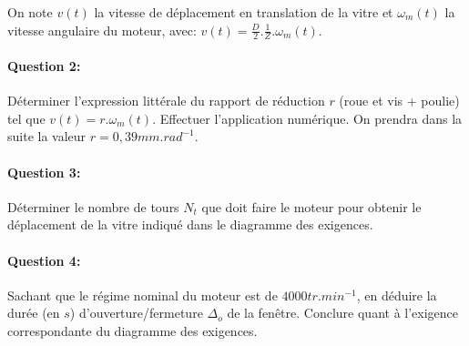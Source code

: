 On note $v(t)$ la vitesse de déplacement en translation de la vitre et $\omega_m(t)$ la vitesse angulaire du moteur, avec: $v(t)=\frac{D}{2}.\frac{1}{Z}.\omega_m(t)$.

\paragraph{Question 2:}	Déterminer l'expression littérale du rapport de réduction $r$ (roue et vis + poulie) tel que
$v(t) = r.\omega_m(t)$. Effectuer l'application numérique. On prendra dans la suite la valeur $r=0,39mm.rad^{-1}$.

\paragraph{Question 3:} Déterminer le nombre de tours $N_t$ que doit faire le moteur pour obtenir le déplacement de la vitre indiqué dans le diagramme des exigences.

\paragraph{Question 4:} Sachant que le régime nominal du moteur est de $4000tr.min^{-1}$, en déduire la durée (en $s$) d'ouverture/fermeture $\Delta_o$ de la fenêtre. Conclure quant à l'exigence correspondante du diagramme des exigences.

%
%

